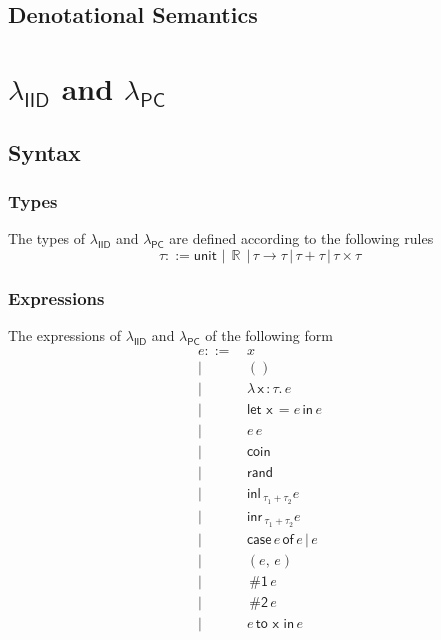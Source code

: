 \documentclass{article}
\DeclareMathOperator*\R{\mathbb{R}}
\newcommand{\iid}{\mathsf{IID}}
\newcommand{\pc}{\mathsf{PC}}
\newcommand{\x}{\mathsf{\,x\,}}
\newcommand{\unit}{\mathsf{unit\,}}
\newcommand{\letc}{\mathsf{let \,}}
\newcommand{\inc}{\mathsf{\, in \,}}
\newcommand{\toc}{\mathsf{\, to \,}}
\newcommand{\rand}{\mathsf{rand\,}}
\newcommand{\coin}{\mathsf{coin\,}}
\newcommand{\inl}{\mathsf{inl\,}}
\newcommand{\inr}{\mathsf{inr\,}}
\newcommand{\case}[3]{\mathsf{case} \, #1 \, \mathsf{of} \, #2 \, | \, #3 \,}
\newcommand{\1}{\mathsf{\,\#1\,}}
\newcommand{\2}{\mathsf{\,\#2\,}}
\begin{document}
\subsection{Denotational Semantics}

\newpage
\section{$\lambda_{\iid}$ and $\lambda_{\pc}$}

\subsection{Syntax}

\subsubsection*{Types}
	The types of $\lambda_{\iid}$ and $\lambda_{\pc}$ are defined according to the following rules
	\begin{equation*}
		\tau ::=
		\unit
		\,|\, \R
		\,|\, \tau \to \tau
		\,|\, \tau + \tau
		\,|\, \tau \times \tau
	\end{equation*}
\subsubsection*{Expressions}
	The expressions of  $\lambda_{\iid}$ and $\lambda_{\pc}$ of the following form
	\begin{equation*}
		\begin{split}
			e ::=\,
			 & x \\
			|& () \\
			|& \lambda \x\! : \tau.\, e \\
			|& \letc \x = e \inc e \\
			|& e\, e \\
			|& \coin \\
			|& \rand \\
			|& \inl_{\tau_1 + \tau_2} e \\
			|& \inr_{\tau_1 + \tau_2} e \\
			|& \case{e}{e}{e} \\
			|& (e,\, e) \\
			|& \1 e \\
			|& \2 e \\
			|& e \toc \x \inc e \\
		\end{split}
	\end{equation*}
\end{document}
